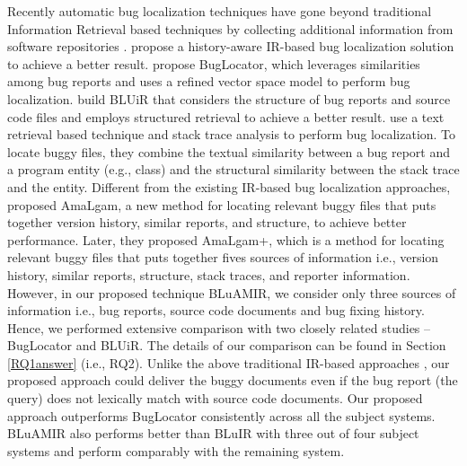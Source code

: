 \documentclass[sigconf,review,anonymous]{acmart}
\begin{document}
Recently automatic bug localization techniques have gone beyond traditional
Information Retrieval based techniques by collecting additional information from software repositories \cite{Sisman, Jian, Saha, Moreno, Wang}.
\citet{Sisman} propose a history-aware IR-based bug localization solution to achieve a better
result. \citet{Jian} propose BugLocator, which leverages similarities among bug reports and uses a refined vector space model to perform bug localization. \citet{Saha} build BLUiR that considers the structure of bug reports and source code files and employs structured retrieval to achieve a better result. \citet{Moreno} use a text retrieval based technique and stack trace analysis to perform bug localization. To locate buggy files, they combine the textual similarity between a bug report and a program entity (e.g., class) and the structural similarity between the stack trace and the entity. Different from the existing IR-based bug localization approaches, \citet{Wang} proposed AmaLgam, a new method for locating relevant buggy files that puts together version history, similar reports, and structure, to achieve better performance. 
Later, they proposed AmaLgam+\cite{Wang2}, which is a method for locating relevant buggy files that puts together fives sources of information i.e., version history, similar reports, structure, stack traces, and reporter information. 
However, in our proposed technique BLuAMIR, we consider only three sources of information i.e., bug reports, source code documents and bug fixing history. 
Hence, we performed extensive comparison with two closely related studies -- BugLocator \cite{Jian} and BLUiR\cite{Saha}.
The details of our comparison can be found in Section \ref{RQ1answer} (i.e., RQ2).
Unlike the above traditional IR-based approaches \cite{Sisman, Jian, Saha, Moreno, Wang, Wang2}, our proposed approach could deliver the buggy documents even if the bug report (the query) does not lexically match with source code documents.
Our proposed approach outperforms BugLocator \cite{Jian} consistently across all the subject systems. BLuAMIR also performs better than BLuIR \cite{Saha} with three out of four subject systems and perform comparably with the remaining system.
\end{document}
